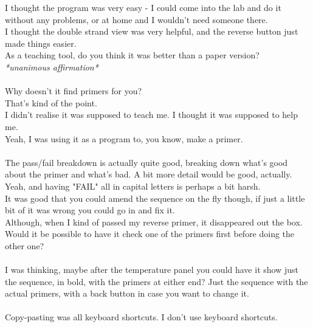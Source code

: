 \documentclass[A4paper]{article}
\begin{document}
\pat I thought the program was very easy - I could come into the lab and do it without any problems, or at
home and I wouldn't need someone there.\\
\pat I thought the double strand view was very helpful, and the reverse button just made things easier.\\
\us As a teaching tool, do you think it was better than a paper version?\\
\textit{*unanimous affirmation*}\\ \\
\pat Why doesn't it find primers for you?\\
\us That's kind of the point.\\
\pat I didn't realise it was supposed to teach me. I thought it was supposed to help me.\\
\pat Yeah, I was using it as a program to, you know, make a primer.\\ \\
\pat The pass/fail breakdown is actually quite good, breaking down what's good about the primer and what's bad.
\pat A bit more detail would be good, actually.\\
\us Yeah, and having "FAIL" all in capital letters is perhaps a bit harsh.\\
\pat It was good that you could amend the sequence on the fly though, if just a little bit of it was wrong you
could go in and fix it.\\
\pat Although, when I kind of passed my reverse primer, it disappeared out the box.\\ 
\pat Would it be possible to have it check one of the primers first before doing the other one?\\ \\
\pam I was thinking, maybe after the temperature panel you could have it show just the sequence, in bold, with
the primers at either end? Just the sequence with the actual primers, with a back button in case you want to 
change it.\\ \\
\pat Copy-pasting was all keyboard shortcuts. I don't use keyboard shortcuts. 
\end{document}

